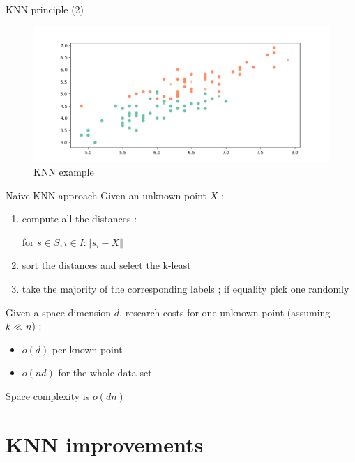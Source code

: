 \documentclass[11 pt]{beamer}
\begin{document}

\begin{frame}{KNN principle (2)}
\begin{figure}
	\centering
	\includegraphics[width=\textwidth]{figures/irisClass2_1.png}
	\caption{KNN example}
	\label{fig:iris2}
\end{figure}
\end{frame}
%

\begin{frame}{Naive KNN approach}
Given an unknown point $X$ :
\begin{enumerate}
	\item compute all the distances :

	for $s \in S, i \in I :\Vert s_i - X\Vert$

	\item sort the distances and select the k-least

	\item take the majority of the corresponding labels ; if equality pick one randomly
\end{enumerate}

Given a space dimension $d$, research costs for one unknown point (assuming $k \ll n$) :

\begin{itemize}
	\item $o(d)$ per known point
	\item $o(nd)$ for the whole data set
\end{itemize}

Space complexity is $o(dn)$
\end{frame}
%
\section{KNN improvements}
\end{document}
